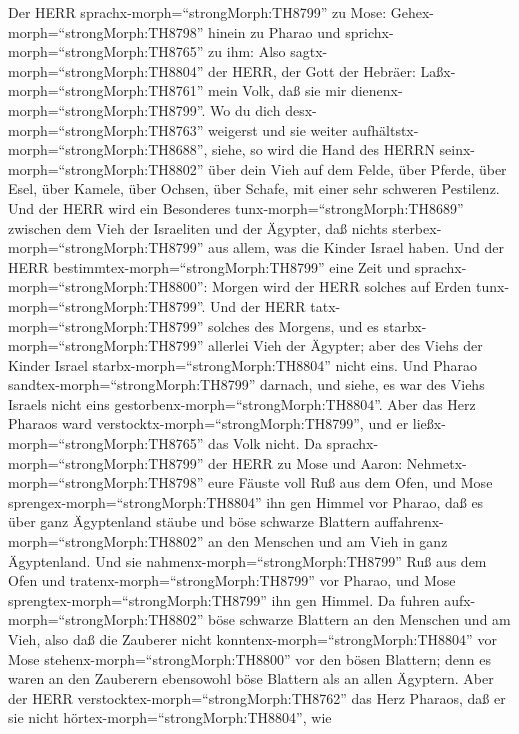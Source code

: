  Der HERR sprachx-morph=``strongMorph:TH8799'' zu Mose:
Gehex-morph=``strongMorph:TH8798'' hinein zu Pharao und
sprichx-morph=``strongMorph:TH8765'' zu ihm: Also
sagtx-morph=``strongMorph:TH8804'' der HERR, der Gott der Hebräer:
Laßx-morph=``strongMorph:TH8761'' mein Volk, daß sie mir
dienenx-morph=``strongMorph:TH8799''.  Wo du dich
desx-morph=``strongMorph:TH8763'' weigerst und sie weiter
aufhältstx-morph=``strongMorph:TH8688'',  siehe, so wird die
Hand des HERRN seinx-morph=``strongMorph:TH8802'' über dein Vieh auf dem
Felde, über Pferde, über Esel, über Kamele, über Ochsen, über Schafe,
mit einer sehr schweren Pestilenz.  Und der HERR wird ein
Besonderes tunx-morph=``strongMorph:TH8689'' zwischen dem Vieh der
Israeliten und der Ägypter, daß nichts
sterbex-morph=``strongMorph:TH8799'' aus allem, was die Kinder Israel
haben.  Und der HERR bestimmtex-morph=``strongMorph:TH8799''
eine Zeit und sprachx-morph=``strongMorph:TH8800'': Morgen wird der HERR
solches auf Erden tunx-morph=``strongMorph:TH8799''.  Und
der HERR tatx-morph=``strongMorph:TH8799'' solches des Morgens, und es
starbx-morph=``strongMorph:TH8799'' allerlei Vieh der Ägypter; aber des
Viehs der Kinder Israel starbx-morph=``strongMorph:TH8804'' nicht eins.
 Und Pharao sandtex-morph=``strongMorph:TH8799'' darnach,
und siehe, es war des Viehs Israels nicht eins
gestorbenx-morph=``strongMorph:TH8804''. Aber das Herz Pharaos ward
verstocktx-morph=``strongMorph:TH8799'', und er
ließx-morph=``strongMorph:TH8765'' das Volk nicht.  Da
sprachx-morph=``strongMorph:TH8799'' der HERR zu Mose und Aaron:
Nehmetx-morph=``strongMorph:TH8798'' eure Fäuste voll Ruß aus dem Ofen,
und Mose sprengex-morph=``strongMorph:TH8804'' ihn gen Himmel vor
Pharao,  daß es über ganz Ägyptenland stäube und böse
schwarze Blattern auffahrenx-morph=``strongMorph:TH8802'' an den
Menschen und am Vieh in ganz Ägyptenland.  Und sie
nahmenx-morph=``strongMorph:TH8799'' Ruß aus dem Ofen und
tratenx-morph=``strongMorph:TH8799'' vor Pharao, und Mose
sprengtex-morph=``strongMorph:TH8799'' ihn gen Himmel. Da fuhren
aufx-morph=``strongMorph:TH8802'' böse schwarze Blattern an den Menschen
und am Vieh,  also daß die Zauberer nicht
konntenx-morph=``strongMorph:TH8804'' vor Mose
stehenx-morph=``strongMorph:TH8800'' vor den bösen Blattern; denn es
waren an den Zauberern ebensowohl böse Blattern als an allen Ägyptern.
 Aber der HERR verstocktex-morph=``strongMorph:TH8762'' das
Herz Pharaos, daß er sie nicht hörtex-morph=``strongMorph:TH8804'', wie
